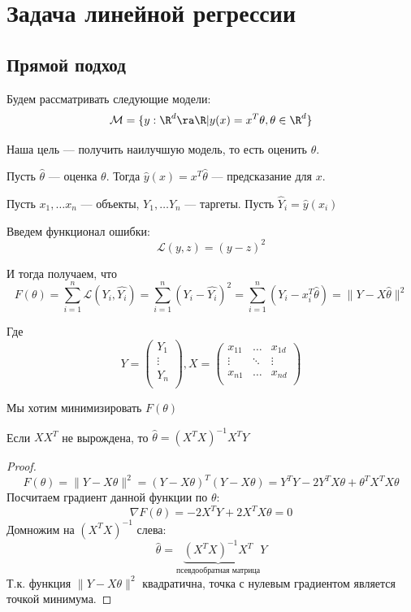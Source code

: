 

\section{Задача линейной регрессии}

\subsection{Прямой подход}
Будем рассматривать следующие модели:
\[\mathcal{M} = \{y: \R^d \ra \R | y(x) = x^T\theta, \theta \in \R^d\}\]

Наша цель --- получить наилучшую модель, то есть оценить \(\theta\). 

Пусть \(\hat{\theta}\) --- оценка \(\theta\). Тогда \(\hat{y}(x) = x^T\hat{\theta}\) --- предсказание для \(x\).

Пусть \(x_1, \dots x_n\) --- объекты, \(Y_1, \dots Y_n\) --- таргеты. Пусть \(\hat{Y}_i = \hat{y}(x_i)\)

Введем функционал ошибки:
\[\mathcal{L}(y, z) = (y - z)^2\]

И тогда получаем, что
\[F(\theta) = \sum_{i = 1}^n \mathcal{L}(Y_i, \hat{Y_i}) = \sum_{i = 1}^n (Y_i - \hat{Y_i})^2 = \sum_{i = 1}^n \left( Y_i - x_i^T\hat{\theta} \right) = \|Y - X\hat{\theta}\|^2\]

Где 
\[Y = \left( \begin{array}{c}
    Y_1 \\
    \vdots \\
    Y_n \\
\end{array} \right), X = \left( \begin{array}{ccc}
    x_{11} & \dots & x_{1d} \\
    \vdots & \ddots & \vdots \\
    x_{n1} & \dots & x_{nd} \\
\end{array} \right)\]

Мы хотим минимизировать \(F(\theta)\)
\begin{proposition}
    Если \(XX^T\) не вырождена, то \(\hat{\theta} = (X^TX)^{-1}X^TY\)
\end{proposition}
\begin{proof}
    \[F(\theta) = \|Y - X\theta\|^2 = (Y - X\theta)^T(Y - X\theta) = Y^TY - 2Y^TX\theta + \theta^TX^TX\theta\]
    Посчитаем градиент данной функции по \(\theta\):
    \[\nabla F(\theta) = -2X^TY + 2X^TX\theta = 0\]
    Домножим на \((X^TX)^{-1}\) слева:
    \[\hat{\theta} = \underbrace{(X^TX)^{-1}X^T}_{\text{псевдообратная матрица}}Y\]
    Т.к. функция \(\|Y - X\theta\|^2\) квадратична, точка с нулевым градиентом является точкой минимума.
\end{proof}


